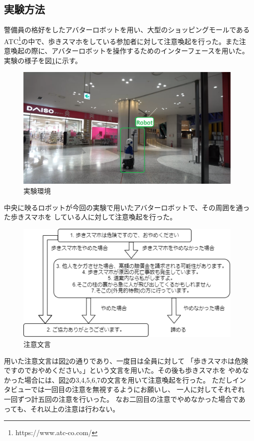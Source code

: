 \documentclass{kuisthesis}
\begin{document}
\subsection{実験方法}
警備員の格好をしたアバターロボットを用い、大型のショッピングモールであるATC\footnote{https://www.atc-co.com/}の中で、歩きスマホをしている参加者に対して注意喚起を行った。また注意喚起の際に、アバターロボットを操作するためのインターフェースを用いた。
実験の様子を図\ref{fig: Experiment}に示す。
\begin{figure}[htbp]
  \includegraphics[width=15cm]{img/Experiment.png}
  \caption{実験環境}
  \label{fig: Experiment}
\end{figure}
中央に映るロボットが今回の実験で用いたアバターロボットで、その周囲を通った歩きスマホを
している人に対して注意喚起を行った。
\begin{figure}[h]
  \includegraphics[width=15cm]{img/waystostop.drawio.png}
  \caption{注意文言}
  \label{fig: Strategy}
\end{figure}
用いた注意文言は図\ref{fig: Strategy}の通りであり、一度目は全員に対して
「歩きスマホは危険ですのでおやめください。」という文言を用いた。その後も歩きスマホを
やめなかった場合には、図\ref{fig: Strategy}の3,4,5,6,7の文言を用いて注意喚起を行った。
ただしインタビューでは一回目の注意を無視するようにお願いし、
一人に対してそれぞれ一回ずつ計五回の注意を行いった。
なお二回目の注意でやめなかった場合であっても、それ以上の注意は行わない。
\end{document}
